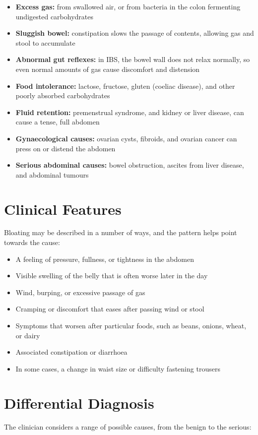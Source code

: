 \begin{itemize}
    \item \textbf{Excess gas:} from swallowed air, or from bacteria in the colon fermenting undigested carbohydrates
    \item \textbf{Sluggish bowel:} constipation slows the passage of contents, allowing gas and stool to accumulate
    \item \textbf{Abnormal gut reflexes:} in IBS, the bowel wall does not relax normally, so even normal amounts of gas cause discomfort and distension
    \item \textbf{Food intolerance:} lactose, fructose, gluten (coeliac disease), and other poorly absorbed carbohydrates
    \item \textbf{Fluid retention:} premenstrual syndrome, and kidney or liver disease, can cause a tense, full abdomen
    \item \textbf{Gynaecological causes:} ovarian cysts, fibroids, and ovarian cancer can press on or distend the abdomen
    \item \textbf{Serious abdominal causes:} bowel obstruction, ascites from liver disease, and abdominal tumours
\end{itemize}

\section*{Clinical Features}
Bloating may be described in a number of ways, and the pattern helps point towards the cause:

\begin{itemize}
    \item A feeling of pressure, fullness, or tightness in the abdomen
    \item Visible swelling of the belly that is often worse later in the day
    \item Wind, burping, or excessive passage of gas
    \item Cramping or discomfort that eases after passing wind or stool
    \item Symptoms that worsen after particular foods, such as beans, onions, wheat, or dairy
    \item Associated constipation or diarrhoea
    \item In some cases, a change in waist size or difficulty fastening trousers
\end{itemize}

\section*{Differential Diagnosis}
The clinician considers a range of possible causes, from the benign to the serious:

